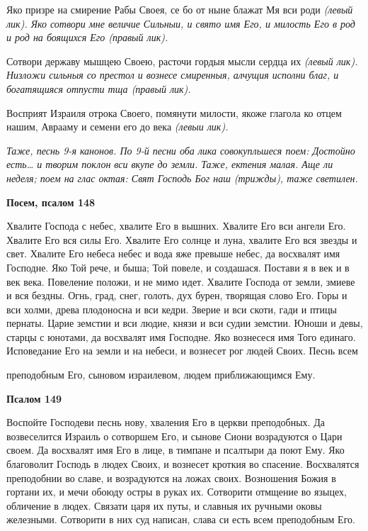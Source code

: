    Яко призре на смирение Рабы Своея, се бо от ныне блажат Мя вси роди
\itshape (левый лик)\normalfont{}. Яко сотвори мне величие Сильныи, и свято имя Его, и милость
Его в род и род на боящихся Его \itshape (правый лик)\normalfont{}.


   Сотвори державу мышцею Своею, расточи гордыя мысли сердца их
\itshape (левый лик)\normalfont{}. Низложи сильныя со престол и вознесе смиренныя, алчущия
исполни благ, и богатящияся отпусти тща \itshape (правый лик)\normalfont{}.


   Восприят Израиля отрока Своего, помянути милости, якоже глагола ко
отцем нашим, Аврааму и семени его до века \itshape (левыи лик)\normalfont{}.


 \itshape Таже, песнь 9-я канонов. По 9-й песни оба лика совокупльшеся поем:\normalfont{}
Достойно есть… \itshape и творим поклон вси вкупе до земли. Таже, ектения малая.
Аще ли неделя; поем на глас октая:\normalfont{} Свят Господь Бог наш \itshape (трижды), таже
светилен.\normalfont{}






 

\bfseries Посем, псалом 148\normalfont{}


   Хвалите Господа с небес, хвалите Его в вышних. Хвалите Его вси ангели
Его. Хвалите Его вся силы Его. Хвалите Его солнце и луна, хвалите Его вся
звезды и свет. Хвалите Его небеса небес и вода яже превыше небес, да
восхвалят имя Господне. Яко Той рече, и быша; Той повеле, и создашася.
Постави я в век и в век века. Повеление положи, и не мимо идет. Хвалите
Господа от земли, змиеве и вся бездны. Огнь, град, снег, голоть, дух бурен,
творящая слово Его. Горы и вси холми, древа плодоносна и вси кедри.
Зверие и вси скоти, гади и птицы пернаты. Царие земстии и вси людие,
князи и вси судии земстии. Юноши и девы, старцы с юнотами, да
восхвалят имя Господне. Яко вознесеся имя Того единаго. Исповедание
Его на земли и на небеси, и вознесет рог людей Своих. Песнь всем

преподобным Его, сыновом израилевом, людем приближающимся
Ему.






 

\bfseries Псалом 149\normalfont{}


   Воспойте Господеви песнь нову, хваления Его в церкви преподобных. Да
возвеселится Израиль о сотворшем Его, и сынове Сиони возрадуются о Цари
своем. Да восхвалят имя Его в лице, в тимпане и псалтыри да поют Ему. Яко
благоволит Господь в людех Своих, и вознесет кроткия во спасение.
Восхвалятся преподобнии во славе, и возрадуются на ложах своих.
Возношения Божия в гортани их, и мечи обоюду остры в руках их.
Сотворити отмщение во языцех, обличение в людех. Связати царя их путы, и
славныя их ручными оковы железными. Сотворити в них суд написан, слава
си есть всем преподобным Его.






